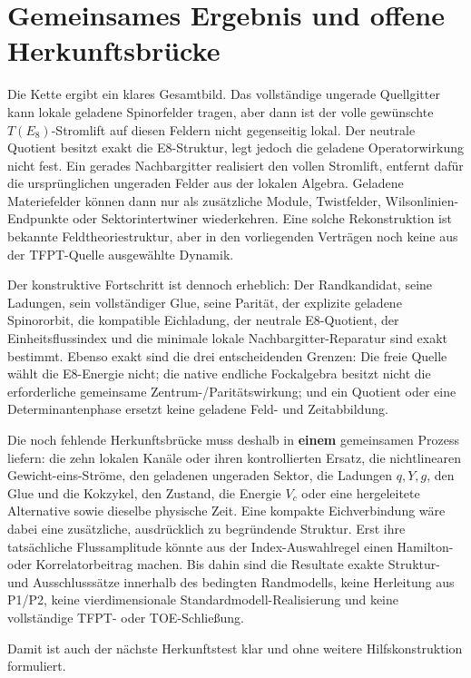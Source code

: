 \section{Gemeinsames Ergebnis und offene Herkunftsbrücke}

Die Kette ergibt ein klares Gesamtbild. Das vollständige ungerade Quellgitter kann lokale geladene Spinorfelder tragen, aber dann ist der volle gewünschte \(T(E_8)\)-Stromlift auf diesen Feldern nicht gegenseitig lokal. Der neutrale Quotient besitzt exakt die E8-Struktur, legt jedoch die geladene Operatorwirkung nicht fest. Ein gerades Nachbargitter realisiert den vollen Stromlift, entfernt dafür die ursprünglichen ungeraden Felder aus der lokalen Algebra. Geladene Materiefelder können dann nur als zusätzliche Module, Twistfelder, Wilsonlinien-Endpunkte oder Sektorintertwiner wiederkehren. Eine solche Rekonstruktion ist bekannte Feldtheoriestruktur, aber in den vorliegenden Verträgen noch keine aus der TFPT-Quelle ausgewählte Dynamik.

Der konstruktive Fortschritt ist dennoch erheblich: Der Randkandidat, seine Ladungen, sein vollständiger Glue, seine Parität, der explizite geladene Spinororbit, die kompatible Eichladung, der neutrale E8-Quotient, der Einheitsflussindex und die minimale lokale Nachbargitter-Reparatur sind exakt bestimmt. Ebenso exakt sind die drei entscheidenden Grenzen: Die freie Quelle wählt die E8-Energie nicht; die native endliche Fockalgebra besitzt nicht die erforderliche gemeinsame Zentrum-/Paritätswirkung; und ein Quotient oder eine Determinantenphase ersetzt keine geladene Feld- und Zeitabbildung.

Die noch fehlende Herkunftsbrücke muss deshalb in \textbf{einem} gemeinsamen Prozess liefern: die zehn lokalen Kanäle oder ihren kontrollierten Ersatz, die nichtlinearen Gewicht-eins-Ströme, den geladenen ungeraden Sektor, die Ladungen \(q,Y,g\), den Glue und die Kokzykel, den Zustand, die Energie \(V_c\) oder eine hergeleitete Alternative sowie dieselbe physische Zeit. Eine kompakte Eichverbindung wäre dabei eine zusätzliche, ausdrücklich zu begründende Struktur. Erst ihre tatsächliche Flussamplitude könnte aus der Index-Auswahlregel einen Hamilton- oder Korrelatorbeitrag machen. Bis dahin sind die Resultate exakte Struktur- und Ausschlusssätze innerhalb des bedingten Randmodells, keine Herleitung aus P1/P2, keine vierdimensionale Standardmodell-Realisierung und keine vollständige TFPT- oder TOE-Schließung.

Damit ist auch der nächste Herkunftstest klar und ohne weitere Hilfskonstruktion formuliert.

